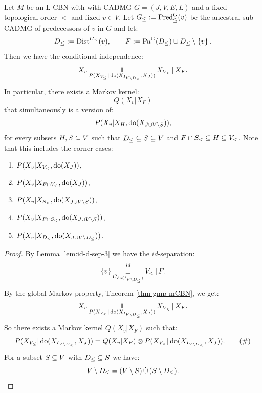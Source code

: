\begin{Lem}
    \label{lem:int-dist-per-node}
    Let $M$ be an L-CBN with with \observational CADMG $G=(J,V,E,L)$ and a fixed topological order $<$ and fixed $v \in V$.
    Let $G_\le:=\mathrm{Pred}^G_\le(v)$ be the ancestral sub-CADMG of predecessors of $v$ in $G$ and let:
    \[ D_\le := \mathrm{Dist}^{G_\le}(v), \qquad F:= \mathrm{Pa}^G(D_\le) \cup D_\le \setminus \left \{ v \right \}. \]
   Then we have the conditional independence:
   \[ X_v \operatorname*{\perp\mkern-11mu\perp}_{P(X_{V_\le}|\operatorname{do}(X_{I_{V\setminus D_\le}},X_J))}  X_{V_<} \operatorname*{|} X_F.\]
   In particular, there exists a Markov kernel:
   \[ Q(X_v|X_F) \] 
   that simultaneously is a version of:
   \begin{align*} 
       P(X_v|X_H,\operatorname{do}(X_{J \cup V\setminus S})), 
    \end{align*}
   for every subsets $H,S \subseteq V$ such that $D_\le \subseteq S \subseteq V$ and $F \cap S_< \subseteq  H \subseteq V_<$.
  Note that this includes the corner cases: 
  \begin{enumerate}
      \item $P(X_v|X_{V_<},\operatorname{do}(X_J))$,
      \item $P(X_v|X_{F\cap V_<},\operatorname{do}(X_J))$,
      \item $P(X_v|X_{S_<},\operatorname{do}(X_{J \cup V\setminus S}))$,
      \item $P(X_v|X_{F \cap S_<},\operatorname{do}(X_{J \cup V\setminus S}))$,
      \item $P(X_v|X_{D_<},\operatorname{do}(X_{J \cup V\setminus D_\le}))$.
  \end{enumerate}
 \begin{proof}
        By Lemma \ref{lem:id-d-sep-3} we have the $id$-separation:
   \[ \left \{ v \right \} \operatorname*{\perp}^{id}_{G_{\operatorname{do}(I_{V\setminus D_\le})}} V_< \operatorname*{|} F.  \]
   By the global Markov property, Theorem \ref{thm-gmp-mCBN}, we get: 
   \[ X_v \operatorname*{\perp\mkern-11mu\perp}_{P(X_{V_\le}|\operatorname{do}(X_{I_{V\setminus D_\le}},X_J))}  X_{V_<} \operatorname*{|} X_F.\]
   So there exists a Markov kernel $Q(X_v|X_F)$ such that:
   \begin{align*}  P(X_{V_\le}|\operatorname{do}(X_{I_{V\setminus D_\le}},X_J)) = Q(X_v|X_F) \otimes P(X_{V_<}|\operatorname{do}(X_{I_{V\setminus D_\le}},X_J)). 
       \label{eq:q-mk-1}\tag{\#}
   \end{align*}
   For a subset $S \subseteq V$ with $D_\le \subseteq S$ we have: 
       \[ V\setminus D_\le = (V\setminus S) \,\dot{\cup}\, (S\setminus D_\le). \] 

\end{proof}
\end{Lem}
